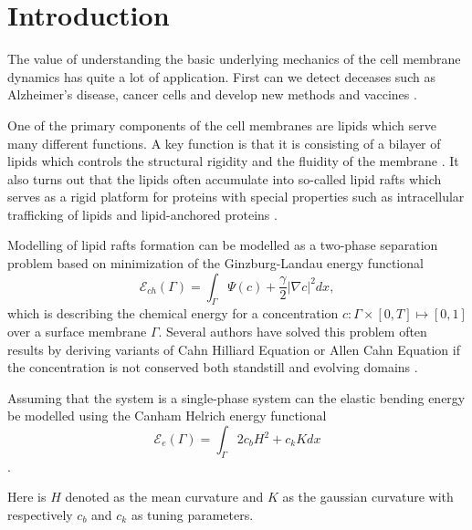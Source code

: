 \section{Introduction}\label{sec:introduction}



The value of understanding the basic underlying mechanics of the cell membrane dynamics has quite a lot of application. First can we detect deceases such as Alzheimer's disease, cancer cells and develop new methods and vaccines \cite{small2006sorting}.

One of the primary components of the cell membranes are lipids which serve many different functions. A key function is that it is consisting of a bilayer of lipids which controls the structural rigidity and the fluidity of the membrane \cite{ neidleman87}. It also turns out that the lipids often accumulate into so-called lipid rafts which serves as a rigid platform for proteins with special properties such as intracellular trafficking of lipids and lipid-anchored proteins \cite{Edidin03}.

Modelling of lipid rafts formation can be modelled as a two-phase separation problem based on minimization of the Ginzburg-Landau energy functional \cite{yushutin19}
\[
\mathcal{E}_{ch}  \left( \Gamma  \right) = \int_{\Gamma  }^{}\Psi \left( c \right) + \frac{\gamma}{2} \left\lvert \nabla c \right\rvert^{2} dx,
\]
which is describing the chemical energy for a concentration $c: \Gamma \times \left[ 0,T \right] \mapsto  \left[ 0,1 \right]  $ over a surface membrane $\Gamma$. Several authors have solved this problem often results by deriving variants of Cahn
Hilliard Equation or Allen Cahn Equation if the concentration is not conserved both standstill and evolving domains \cite{yushutin19, ratz16,Gera2017, caetano21,yushutin19} .

Assuming that the system is a single-phase system can the elastic bending energy be modelled using the Canham Helrich energy functional \cite{wang08} \[
\mathcal{E} _{e}\left( \Gamma  \right) =   \int_{\Gamma }^{}  2 c_{b} H^{2} + c_{k} K  dx
\].

Here is $H$ denoted as the mean curvature and $K$ as the gaussian curvature with respectively $c_{b}$ and $c_{k}$ as tuning parameters.


















